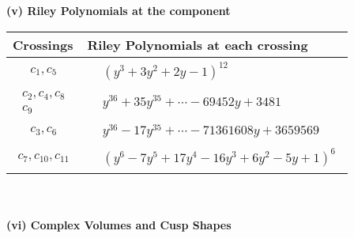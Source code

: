 \documentclass[1p]{elsarticle_modified}
\theoremstyle{definition}
\begin{document}
\newpage\renewcommand{\arraystretch}{1}
\flushleft \textbf{(v) Riley Polynomials at the component}\newline \\
\begin{tabular}{m{50pt}|m{274pt}}
Crossings & \hspace{64pt}Riley Polynomials at each crossing \\
\hline $$\begin{aligned}c_{1},c_{5}\end{aligned}$$&$\begin{aligned}
&(y^3+3 y^2+2 y-1)^{12}
\end{aligned}$\\
\hline $$\begin{aligned}c_{2},c_{4},c_{8}\\c_{9}\end{aligned}$$&$\begin{aligned}
&y^{36}+35 y^{35}+\cdots-69452 y+3481
\end{aligned}$\\
\hline $$\begin{aligned}c_{3},c_{6}\end{aligned}$$&$\begin{aligned}
&y^{36}-17 y^{35}+\cdots-71361608 y+3659569
\end{aligned}$\\
\hline $$\begin{aligned}c_{7},c_{10},c_{11}\end{aligned}$$&$\begin{aligned}
&(y^6-7 y^5+17 y^4-16 y^3+6 y^2-5 y+1)^6
\end{aligned}$\\
\hline
\end{tabular}\\~\\
\newpage\flushleft \textbf{(vi) Complex Volumes and Cusp Shapes}
\end{document}
